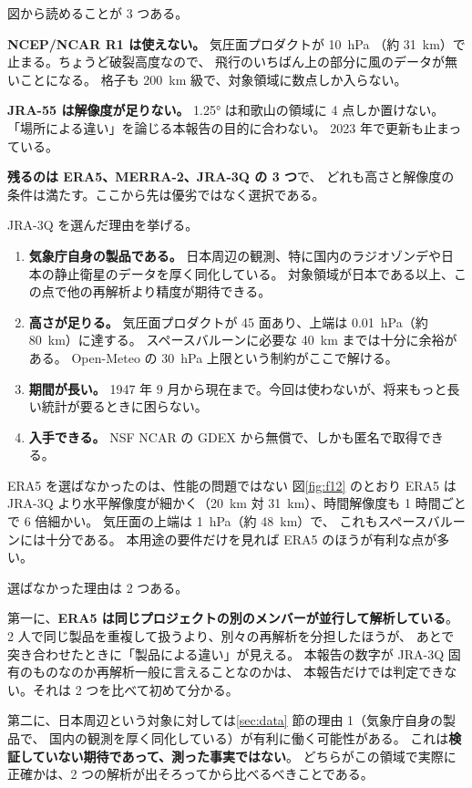 図から読めることが 3 つある。

\textbf{NCEP/NCAR R1 は使えない。} 気圧面プロダクトが \SI{10}{\hecto\pascal}
（約 \SI{31}{\kilo\metre}）で止まる。ちょうど破裂高度なので、
飛行のいちばん上の部分に風のデータが無いことになる。
格子も \SI{200}{\kilo\metre} 級で、対象領域に数点しか入らない。

\textbf{JRA-55 は解像度が足りない。} \ang{1.25} は和歌山の領域に 4 点しか置けない。
「場所による違い」を論じる本報告の目的に合わない。
2023 年で更新も止まっている。

\textbf{残るのは ERA5、MERRA-2、JRA-3Q の 3 つ}で、
どれも高さと解像度の条件は満たす。ここから先は優劣ではなく選択である。

JRA-3Q を選んだ理由を挙げる。

\begin{enumerate}
  \item \textbf{気象庁自身の製品である。}
        日本周辺の観測、特に国内のラジオゾンデや日本の静止衛星のデータを厚く同化している。
        対象領域が日本である以上、この点で他の再解析より精度が期待できる。
  \item \textbf{高さが足りる。}
        気圧面プロダクトが 45 面あり、上端は \SI{0.01}{\hecto\pascal}（約 \SI{80}{\kilo\metre}）に達する。
        スペースバルーンに必要な \SI{40}{\kilo\metre} までは十分に余裕がある。
        Open-Meteo の \SI{30}{\hecto\pascal} 上限という制約がここで解ける。
  \item \textbf{期間が長い。}
        1947 年 9 月から現在まで。今回は使わないが、将来もっと長い統計が要るときに困らない。
  \item \textbf{入手できる。}
        NSF NCAR の GDEX から無償で、しかも匿名で取得できる。
\end{enumerate}

\begin{whybox}{ERA5 を選ばなかったのは、性能の問題ではない}
図\ref{fig:f12} のとおり ERA5 は JRA-3Q より水平解像度が細かく（\SI{20}{\kilo\metre} 対
\SI{31}{\kilo\metre}）、時間解像度も 1 時間ごとで 6 倍細かい。
気圧面の上端は \SI{1}{\hecto\pascal}（約 \SI{48}{\kilo\metre}）で、
これもスペースバルーンには十分である。
本用途の要件だけを見れば ERA5 のほうが有利な点が多い。

選ばなかった理由は 2 つある。

第一に、\textbf{ERA5 は同じプロジェクトの別のメンバーが並行して解析している}。
2 人で同じ製品を重複して扱うより、別々の再解析を分担したほうが、
あとで突き合わせたときに「製品による違い」が見える。
本報告の数字が JRA-3Q 固有のものなのか再解析一般に言えることなのかは、
本報告だけでは判定できない。それは 2 つを比べて初めて分かる。

第二に、日本周辺という対象に対しては\ref{sec:data} 節の理由 1（気象庁自身の製品で、
国内の観測を厚く同化している）が有利に働く可能性がある。
これは\textbf{検証していない期待であって、測った事実ではない}。
どちらがこの領域で実際に正確かは、2 つの解析が出そろってから比べるべきことである。
\end{whybox}


